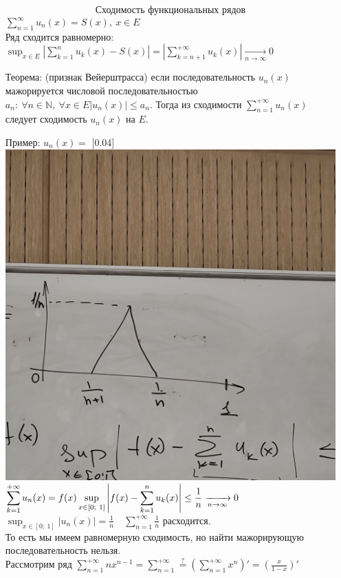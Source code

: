 \documentclass[12pt, letterpaper, twoside]{article}
\newcommand{\DS}{\displaystyle}
\newcommand{\oo}{\infty}
\newcommand{\Abs}[1]{\left| #1 \right|}
\newcommand{\mb}[1]{\mathbb{#1}}
\begin{document}
\begin{enumerate}
        \[\text{Сходимость функциональных рядов}\]
        $\DS \sum_{n = 1}^{\oo} u_n (x) = S(x),\ x\in E$\\
        Ряд сходится равномерно:\\
        $\DS\sup_{x\in E} \Abs{\sum_{k = 1}^{n}u_k(x) - S(x)} = \Abs{\sum_{k = n + 1}^{+\oo} u_k(x)} \xrightarrow[n\rightarrow \oo]{} 0$\\
        \item[Теорема:] (признак Вейерштрасса) если последовательность $u_n(x)$ мажорируется числовой последовательностью $a_n:\ \forall n\in \mb{N},\ \forall x\in E \Abs{u_n(x)}\leq a_n$. Тогда из сходимости $\DS \sum_{n =1}^{+\oo}u_n(x)$  следует сходимость $u_n(x)$ на $E$.\\
        \item[Пример:] $u_n(x) = $
        \scalebox{0.06}[0.04]{\includegraphics{../pictures/График матан2.jpg}}\\
        $\DS \sum_{k = 1}^{+\oo} u_n(x) = f(x)\\
        \sup_{x\in[0;\ 1]} \Abs{f(x) - \sum_{k = 1}^{n}u_k(x)}\leq \frac{1}{n} \xrightarrow[n\rightarrow \oo]{} 0$\\
        $\DS\sup_{x \in [0;\ 1]}\Abs{u_n(x)} = \frac{1}{n}\quad \sum_{n = 1}^{+\oo} \frac{1}{n}$ расходится.\\
        То есть мы имеем равномерную сходимость, но найти мажорирующую последовательность нельзя.\\
        Рассмотрим ряд $\DS \sum_{n = 1}^{+\oo} nx^{n - 1} = \sum_{n =1}^{+\oo} \overset{?}{=} \left( \sum_{n = 1}^{+\oo} x^n \right)' = \left( \frac{x}{1 - x} \right)'$
    \end{enumerate}
\end{document}
